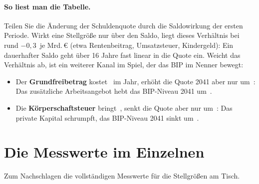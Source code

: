 \begin{table}[!htb]
\centering\small

\caption{Wirkung nach fünf Perioden (Ende des Pfads) gegenüber dem Status-quo-Pfad, je
Schritt, Politik über alle Perioden unverändert. Status quo: Schuldenquote \SQschuldEnde\,\%,
BIP-Niveau \SQbipEnde\,\Mrd, \COz{} kumuliert \SQcoEnde\,Mt.}
\label{tab:pfad}
\end{table}

\paragraph{So liest man die Tabelle.} Teilen Sie die Änderung der Schuldenquote durch die
Saldowirkung der ersten Periode. Wirkt eine Stellgröße nur über den Saldo, liegt dieses
Verhältnis bei rund $-0{,}3$\,\Pp{} je Mrd.\,\euro{} (etwa Rentenbeitrag, Umsatzsteuer,
Kindergeld): Ein dauerhafter Saldo geht über 16 Jahre fast linear in die Quote ein. Weicht
das Verhältnis ab, ist ein weiterer Kanal im Spiel, der das BIP im Nenner bewegt:
\begin{itemize}
\item Der \textbf{Grundfreibetrag} kostet \,\Mrd{} im Jahr, erhöht
  die Quote 2041 aber nur um \,\Pp: Das zusätzliche
  Arbeitsangebot hebt das BIP-Niveau 2041 um \,\Mrd.
\item Die \textbf{Körperschaftsteuer} bringt \,\Mrd, senkt die Quote aber
  nur um \,\Pp: Das private Kapital schrumpft, das BIP-Niveau 2041 sinkt um
  \,\Mrd.
\end{itemize}

\section{Die Messwerte im Einzelnen}

Zum Nachschlagen die vollständigen Messwerte für die Stellgrößen am Tisch.

\begin{table}[!htb]
\centering\scriptsize
\setlength{\tabcolsep}{3pt}

\caption{Wirkung auf die Kanäle (erste Periode, je Schritt). Das sind die Kantengewichte der
Ressortgraphen, einschließlich der dort weggelassenen kleinen Werte.}
\label{tab:kanaele}
\end{table}

\begin{table}[!htb]
\centering\scriptsize
\setlength{\tabcolsep}{3pt}

\caption{Wirkung auf die Kennzahlen (erste Periode, je Schritt).}
\label{tab:kennzahlen}
\end{table}

\begin{table}[!htb]
\centering\scriptsize
\setlength{\tabcolsep}{3pt}

\caption{Wirkung der Stellgrößen der klassischen Fläche auf die Kennzahlen (erste Periode).}
\label{tab:weitere}
\end{table}
